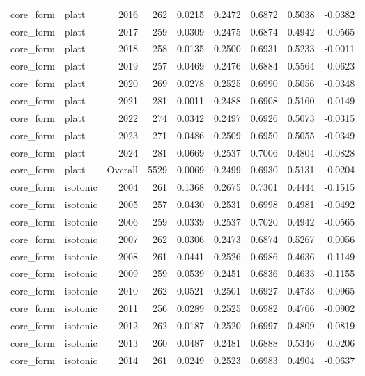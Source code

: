 \begin{table}[t]
\begin{tabular}{@{} l l r r r r r r r @{} }
      core\_form & platt & 2016 & 262 & 0.0215 & 0.2472 & 0.6872 & 0.5038 & -0.0382 \\
      core\_form & platt & 2017 & 259 & 0.0309 & 0.2475 & 0.6874 & 0.4942 & -0.0565 \\
      core\_form & platt & 2018 & 258 & 0.0135 & 0.2500 & 0.6931 & 0.5233 & -0.0011 \\
      core\_form & platt & 2019 & 257 & 0.0469 & 0.2476 & 0.6884 & 0.5564 & 0.0623 \\
      core\_form & platt & 2020 & 269 & 0.0278 & 0.2525 & 0.6990 & 0.5056 & -0.0348 \\
      core\_form & platt & 2021 & 281 & 0.0011 & 0.2488 & 0.6908 & 0.5160 & -0.0149 \\
      core\_form & platt & 2022 & 274 & 0.0342 & 0.2497 & 0.6926 & 0.5073 & -0.0315 \\
      core\_form & platt & 2023 & 271 & 0.0486 & 0.2509 & 0.6950 & 0.5055 & -0.0349 \\
      core\_form & platt & 2024 & 281 & 0.0669 & 0.2537 & 0.7006 & 0.4804 & -0.0828 \\
      core\_form & platt & Overall & 5529 & 0.0069 & 0.2499 & 0.6930 & 0.5131 & -0.0204 \\
      core\_form & isotonic & 2004 & 261 & 0.1368 & 0.2675 & 0.7301 & 0.4444 & -0.1515 \\
      core\_form & isotonic & 2005 & 257 & 0.0430 & 0.2531 & 0.6998 & 0.4981 & -0.0492 \\
      core\_form & isotonic & 2006 & 259 & 0.0339 & 0.2537 & 0.7020 & 0.4942 & -0.0565 \\
      core\_form & isotonic & 2007 & 262 & 0.0306 & 0.2473 & 0.6874 & 0.5267 & 0.0056 \\
      core\_form & isotonic & 2008 & 261 & 0.0441 & 0.2526 & 0.6986 & 0.4636 & -0.1149 \\
      core\_form & isotonic & 2009 & 259 & 0.0539 & 0.2451 & 0.6836 & 0.4633 & -0.1155 \\
      core\_form & isotonic & 2010 & 262 & 0.0521 & 0.2501 & 0.6927 & 0.4733 & -0.0965 \\
      core\_form & isotonic & 2011 & 256 & 0.0289 & 0.2525 & 0.6982 & 0.4766 & -0.0902 \\
      core\_form & isotonic & 2012 & 262 & 0.0187 & 0.2520 & 0.6997 & 0.4809 & -0.0819 \\
      core\_form & isotonic & 2013 & 260 & 0.0487 & 0.2481 & 0.6888 & 0.5346 & 0.0206 \\
      core\_form & isotonic & 2014 & 261 & 0.0249 & 0.2523 & 0.6983 & 0.4904 & -0.0637 \\

\end{tabular}
\end{table}
